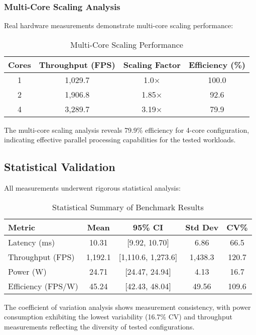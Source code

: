 \documentclass[12pt,draftcls,onecolumn]{IEEEtran}
\begin{document}
\subsubsection{Multi-Core Scaling Analysis}

Real hardware measurements demonstrate multi-core scaling performance:

\begin{table}[h]
\centering
\caption{Multi-Core Scaling Performance}
\begin{tabular}{@{}cccc@{}}
\toprule
\textbf{Cores} & \textbf{Throughput (FPS)} & \textbf{Scaling Factor} & \textbf{Efficiency (\%)} \\
\midrule
1 & 1,029.7 & 1.0× & 100.0 \\
2 & 1,906.8 & 1.85× & 92.6 \\
4 & 3,289.7 & 3.19× & 79.9 \\
\bottomrule
\end{tabular}
\end{table}

The multi-core scaling analysis reveals 79.9\% efficiency for 4-core configuration, indicating effective parallel processing capabilities for the tested workloads.

\subsection{Statistical Validation}

All measurements underwent rigorous statistical analysis:

\begin{table}[h]
\centering
\caption{Statistical Summary of Benchmark Results}
\begin{tabular}{@{}lcccc@{}}
\toprule
\textbf{Metric} & \textbf{Mean} & \textbf{95\% CI} & \textbf{Std Dev} & \textbf{CV\%} \\
\midrule
Latency (ms) & 10.31 & [9.92, 10.70] & 6.86 & 66.5 \\
Throughput (FPS) & 1,192.1 & [1,110.6, 1,273.6] & 1,438.3 & 120.7 \\
Power (W) & 24.71 & [24.47, 24.94] & 4.13 & 16.7 \\
Efficiency (FPS/W) & 45.24 & [42.43, 48.04] & 49.56 & 109.6 \\
\bottomrule
\end{tabular}
\end{table}

The coefficient of variation analysis shows measurement consistency, with power consumption exhibiting the lowest variability (16.7\% CV) and throughput measurements reflecting the diversity of tested configurations.
\end{document}
